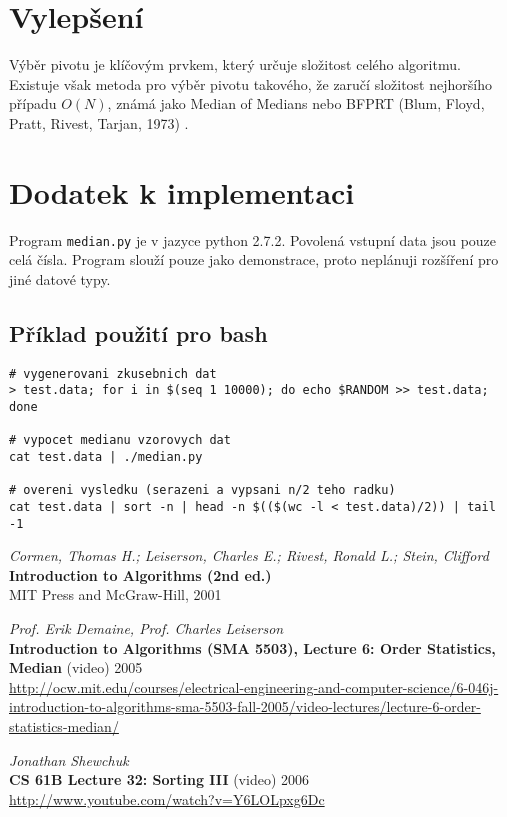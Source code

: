 \documentclass[11pt]{article}
\begin{document}
\section{Vylepšení}
Výběr pivotu je klíčovým prvkem, který určuje složitost celého algoritmu. Existuje
však metoda pro výběr pivotu takového, že zaručí složitost 
nejhoršího případu $O(N)$, známá jako {\sc Median of Medians} nebo 
{\sc BFPRT (Blum, Floyd, Pratt, Rivest, Tarjan, 1973)} \cite{ocwmit}.

\section{Dodatek k implementaci}
Program {\tt median.py} je v jazyce python 2.7.2. Povolená vstupní data jsou 
pouze celá čísla.  Program slouží pouze jako demonstrace, proto neplánuji 
rozšíření pro jiné datové typy.

\subsection{Příklad použití pro bash}
\begin{verbatim}
# vygenerovani zkusebnich dat
> test.data; for i in $(seq 1 10000); do echo $RANDOM >> test.data; done

# vypocet medianu vzorovych dat
cat test.data | ./median.py

# overeni vysledku (serazeni a vypsani n/2 teho radku)
cat test.data | sort -n | head -n $(($(wc -l < test.data)/2)) | tail -1

\end{verbatim}

\begin{thebibliography}{3}
{\em Cormen, Thomas H.; Leiserson, Charles E.; 
	Rivest, Ronald L.; Stein, Clifford} \\
{\bf Introduction to Algorithms (2nd ed.)} \\
	MIT Press and McGraw-Hill, 2001

{\em Prof. Erik Demaine, Prof. Charles Leiserson} \\
{\bf Introduction to Algorithms (SMA 5503), 
	Lecture 6: Order Statistics, Median} (video) 2005 \\
\url{http://ocw.mit.edu/courses/electrical-engineering-and-computer-science/6-046j-introduction-to-algorithms-sma-5503-fall-2005/video-lectures/lecture-6-order-statistics-median/}

{\em Jonathan Shewchuk} \\
{\bf CS 61B Lecture 32: Sorting III} (video) 2006 \\
\url{http://www.youtube.com/watch?v=Y6LOLpxg6Dc}


\end{thebibliography}
\end{document}
